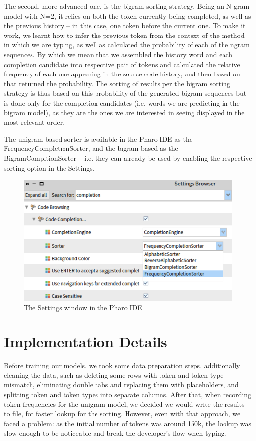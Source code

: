 The second, more advanced one, is the bigram sorting strategy. Being an N-gram model with N=2, it relies on both the token currently being completed, as well as the previous history -- in this case, one token before the current one. To make it work, we learnt how to infer the previous token from the context of the method in which we are typing, as well as calculated the probability of each of the ngram sequences. By which we mean that we assembled the history word and each completion candidate into respective pair of tokens and calculated the relative frequency of each one appearing in the source code history, and then based on that returned the probability. The sorting of results per the bigram sorting strategy is thus based on this probability of the generated bigram sequences but is done only for the completion candidates (i.e. words we are predicting in the bigram model), as they are the ones we are interested in seeing displayed in the most relevant order.

The unigram-based sorter is available in the Pharo IDE as the FrequencyCompletionSorter, and the bigram-based as the BigramCompltionSorter -- i.e. they can already be used by enabling the respective sorting option in the Settings.

\begin{figure}[H]
    \centering
    \includegraphics[width=0.9\linewidth]{images/settings.png}
    \caption{The Settings window in the Pharo IDE}
    \label{fig:settings}
\end{figure}

\section{Implementation Details}
\label{sec:ProposedSolution-Implementation}
Before training our models, we took some data preparation steps, additionally cleaning the data, such as deleting some rows with token and token type mismatch, eliminating double tabs and replacing them with placeholders, and splitting token and token types into separate columns. After that, when recording token frequencies for the unigram model, we decided we would write the results to file, for faster lookup for the sorting. However, even with that approach, we faced a problem: as the initial number of tokens was around 150k, the lookup was slow enough to be noticeable and break the developer's flow when typing. 

